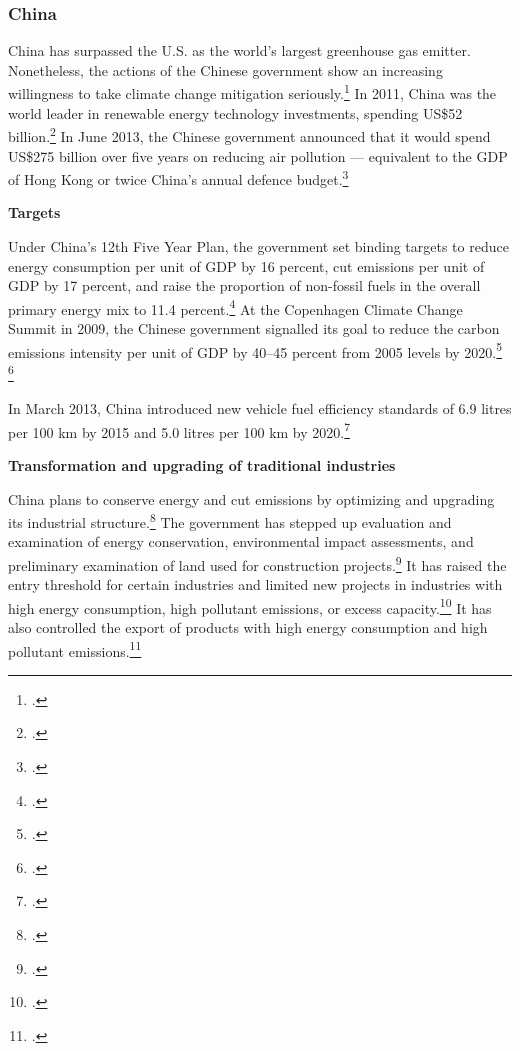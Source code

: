 \documentclass[10pt]{article}
\begin{document}
	\subsubsection{China}
	
	

China has surpassed the U.S. as the world’s largest greenhouse gas emitter.
Nonetheless, the actions of the Chinese government show an increasing willingness to take climate change mitigation seriously.\footcite[][]{ChinaTopEmission}
In 2011, China was the world leader in renewable energy technology investments, spending US\$52 billion.\footcite[][]{RenewableInvestment}
In June 2013, the Chinese government announced that it would spend US\$275 billion over five years on reducing air pollution --- equivalent to the GDP of Hong Kong or twice China's annual defence budget.\footcite[][p. 18]{EastGrey2013}




\textbf{Targets}



Under China's 12th Five Year Plan, the government set binding targets to reduce energy consumption per unit of GDP by 16 percent, cut  emissions per unit of GDP by 17 percent, and raise the proportion of non-fossil fuels in the overall primary energy mix to 11.4 percent.\footcite[][]{FiveYearPlan}
At the Copenhagen Climate Change Summit in 2009, the Chinese government signalled its goal to reduce the carbon emissions intensity per unit of GDP by 40--45 percent from 2005 levels by 2020.\footcite[][p. 108]{UNHumanDev2013} \footcite[][]{FiveYearPlan}



In March 2013, China introduced new vehicle fuel efficiency standards of 6.9 litres per 100 km by 2015 and 5.0 litres per 100 km by 2020.\footcite[][p. 21]{Supermajordammerung}



\textbf{Transformation and upgrading of traditional industries}



China plans to conserve energy and cut emissions by optimizing and upgrading its industrial structure.\footcite[][]{ChinaRestructuring}
The government has stepped up evaluation and examination of energy conservation, environmental impact assessments, and preliminary examination of land used for construction projects.\footcite[][]{ChinaRestructuring}
It has raised the entry threshold for certain industries and limited new projects in industries with high energy consumption, high pollutant emissions, or excess capacity.\footcite[][]{ChinaRestructuring}
It has also controlled the export of products with high energy consumption and high pollutant emissions.\footcite[][]{ChinaRestructuring}
\end{document}
